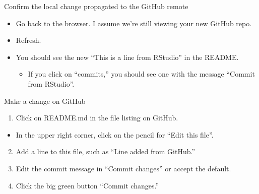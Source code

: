 \documentclass[
  ignorenonframetext,
]{beamer}
\providecommand{\tightlist}{%
  \setlength{\itemsep}{0pt}\setlength{\parskip}{0pt}}
\begin{document}
\begin{frame}{Confirm the local change propagated to the GitHub remote}
\protect\hypertarget{confirm-the-local-change-propagated-to-the-github-remote}{}

\begin{itemize}
\tightlist
\item
  Go back to the browser. I assume we're still viewing your new GitHub
  repo.
\item
  Refresh.
\item
  You should see the new ``This is a line from RStudio'' in the README.

  \begin{itemize}
  \tightlist
  \item
    If you click on ``commits,'' you should see one with the message
    ``Commit from RStudio''.
  \end{itemize}
\end{itemize}

\end{frame}

\begin{frame}{Make a change on GitHub}
\protect\hypertarget{make-a-change-on-github}{}

\begin{enumerate}
\tightlist
\item
  Click on README.md in the file listing on GitHub.
\end{enumerate}

\begin{itemize}
\tightlist
\item
  In the upper right corner, click on the pencil for ``Edit this file''.
\end{itemize}

\begin{enumerate}
\setcounter{enumi}{1}
\tightlist
\item
  Add a line to this file, such as ``Line added from GitHub.''
\item
  Edit the commit message in ``Commit changes'' or accept the default.
\item
  Click the big green button ``Commit changes.''
\end{enumerate}

\end{frame}
\end{document}
